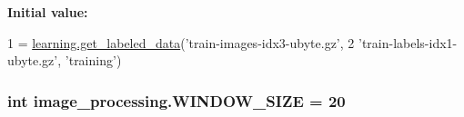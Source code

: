 {\bfseries Initial value\-:}
\begin{DoxyCode}
1 = \hyperlink{namespacelearning_a97ec8093e520fef4cdd5dcf7782e0ac5}{learning.get\_labeled\_data}(\textcolor{stringliteral}{'train-images-idx3-ubyte.gz'},
2                                 \textcolor{stringliteral}{'train-labels-idx1-ubyte.gz'}, \textcolor{stringliteral}{'training'})
\end{DoxyCode}
\hypertarget{namespaceimage__processing_a4ef4515e8101fe5f0ef30c37d5f5b2e0}{
\subsubsection[{W\-I\-N\-D\-O\-W\-\_\-\-S\-I\-Z\-E}]{\setlength{\rightskip}{0pt plus 5cm}int image\-\_\-processing.\-W\-I\-N\-D\-O\-W\-\_\-\-S\-I\-Z\-E = 20}}\label{namespaceimage__processing_a4ef4515e8101fe5f0ef30c37d5f5b2e0}
